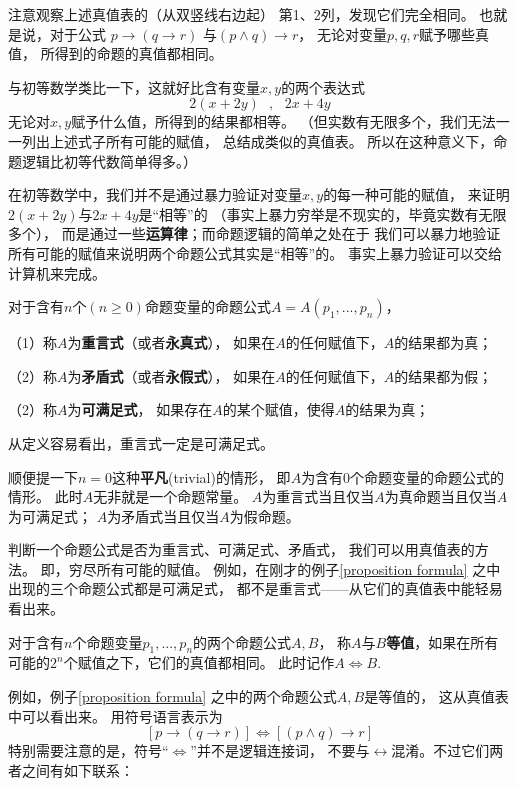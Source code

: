 注意观察上述真值表的（从双竖线右边起）
第1、2列，发现它们完全相同。
也就是说，对于公式
$p\rightarrow (q\rightarrow r)$
与$(p\wedge q)\rightarrow r$，
无论对变量$p,q,r$赋予哪些真值，
所得到的命题的真值都相同。

与初等数学类比一下，这就好比含有变量$x,y$的两个表达式
$$2(x+2y)\,\,\,\,,\,\,\,\,2x+4y$$
无论对$x,y$赋予什么值，所得到的结果都相等。
（但实数有无限多个，我们无法一一列出上述式子所有可能的赋值，
总结成类似的真值表。
所以在这种意义下，命题逻辑比初等代数简单得多。）\vs

在初等数学中，我们并不是通过暴力验证对变量$x,y$的每一种可能的赋值，
来证明$2(x+2y)$与$2x+4y$是“相等”的
（事实上暴力穷举是不现实的，毕竟实数有无限多个），
而是通过一些\textbf{运算律}；而命题逻辑的简单之处在于
我们可以暴力地验证所有可能的赋值来说明两个命题公式其实是“相等”的。
事实上暴力验证可以交给计算机来完成。

\begin{definition}[命题公式的分类]
对于含有$n$个$(n\geq0)$命题变量的命题公式$A=A(p_1,...,p_n)$，

（1）称$A$为\textbf{重言式}（或者\textbf{永真式}），
如果在$A$的任何赋值下，$A$的结果都为真；

（2）称$A$为\textbf{矛盾式}（或者\textbf{永假式}），
如果在$A$的任何赋值下，$A$的结果都为假；

（2）称$A$为\textbf{可满足式}，
如果存在$A$的某个赋值，使得$A$的结果为真；
\end{definition}

从定义容易看出，重言式一定是可满足式。

顺便提一下$n=0$这种\textbf{平凡}(trivial)的情形，
即$A$为含有0个命题变量的命题公式的情形。
此时$A$无非就是一个命题常量。
$A$为重言式当且仅当$A$为真命题当且仅当$A$为可满足式；
$A$为矛盾式当且仅当$A$为假命题。\vs

判断一个命题公式是否为重言式、可满足式、矛盾式，
我们可以用真值表的方法。
即，穷尽所有可能的赋值。
例如，在刚才的例子\ref{proposition formula}
之中出现的三个命题公式都是可满足式，
都不是重言式——从它们的真值表中能轻易看出来。

\begin{definition}[命题公式的等值]
对于含有$n$个命题变量$p_1,...,p_n$的两个命题公式$A,B$，
称$A$与$B$\textbf{等值}，如果在所有可能的$2^n$个赋值之下，它们的真值都相同。
此时记作$A\Leftrightarrow B$.
\end{definition}
例如，例子\ref{proposition formula}
之中的两个命题公式$A,B$是等值的，
这从真值表中可以看出来。
用符号语言表示为
$$[p\rightarrow (q\rightarrow r)]
\Leftrightarrow [(p\wedge q)\rightarrow r]$$
特别需要注意的是，符号“$\Leftrightarrow$”并不是逻辑连接词，
不要与$\leftrightarrow$混淆。不过它们两者之间有如下联系：

